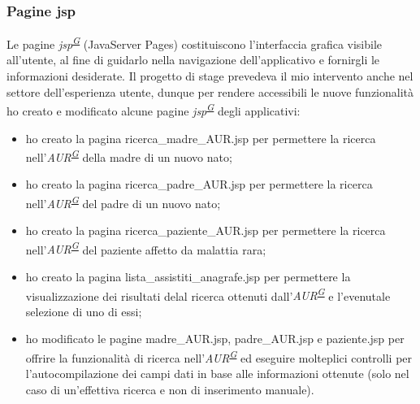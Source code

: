 \documentclass[a4paper]{article}
\begin{document}
\subsubsection{Pagine jsp}
Le pagine \textit{jsp\textsuperscript{\hyperref[sec:gl]{G}}} (JavaServer Pages) costituiscono l'interfaccia grafica visibile all'utente, al fine di guidarlo nella navigazione dell'applicativo e fornirgli le informazioni desiderate. Il progetto di stage prevedeva il mio intervento anche nel settore dell'esperienza utente, dunque per rendere accessibili le nuove funzionalità ho creato e modificato alcune pagine \textit{jsp\textsuperscript{\hyperref[sec:gl]{G}}} degli applicativi:
\begin{itemize}
	\item ho creato la pagina ricerca\_madre\_AUR.jsp per permettere la ricerca nell'\textit{AUR\textsuperscript{\hyperref[sec:gl]{G}}} della madre di un nuovo nato;
    \item ho creato la pagina ricerca\_padre\_AUR.jsp per permettere la ricerca nell'\textit{AUR\textsuperscript{\hyperref[sec:gl]{G}}} del padre di un nuovo nato;
    \item ho creato la pagina ricerca\_paziente\_AUR.jsp per permettere la ricerca nell'\textit{AUR\textsuperscript{\hyperref[sec:gl]{G}}} del paziente affetto da malattia rara;
    \item ho creato la pagina lista\_assistiti\_anagrafe.jsp per permettere la visualizzazione dei risultati delal ricerca ottenuti dall'\textit{AUR\textsuperscript{\hyperref[sec:gl]{G}}} e l'evenutale selezione di uno di essi;
    \item ho modificato le pagine madre\_AUR.jsp, padre\_AUR.jsp e paziente.jsp per offrire la funzionalità di ricerca nell'\textit{AUR\textsuperscript{\hyperref[sec:gl]{G}}} ed eseguire molteplici controlli per l'autocompilazione dei campi dati in base alle informazioni ottenute (solo nel caso di un'effettiva ricerca e non di inserimento manuale).
\end{itemize}
\end{document}
